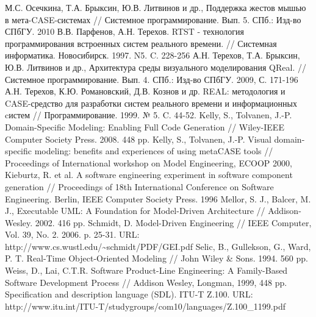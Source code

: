 \documentclass[a4paper]{article}
\begin{document}
\begin{thebibliography}{9001}
   М.С. Осечкина, Т.А. Брыксин, Ю.В. Литвинов и др., Поддержка жестов мышью в мета-CASE-системах  // Системное программирование. Вып. 5. СПб.: Изд-во СПбГУ. 2010
   В.В. Парфенов, А.Н. Терехов. RTST - технология программирования встроенных систем реального времени. // Системная информатика. Новосибирск. 1997. N5. C. 228-256
   А.Н. Терехов, Т.А. Брыксин, Ю.В. Литвинов и др., Архитектура среды визуального моделирования QReal. // Системное программирование. Вып. 4. СПб.: Изд-во СПбГУ. 2009, С. 171-196
   А.Н. Терехов, К.Ю. Романовский, Д.В. Кознов и др. REAL: методология и CASE-средство для разработки систем реального времени и информационных cистем // Программирование. 1999. № 5. C. 44-52.
   Kelly, S., Tolvanen, J.-P. Domain-Specific Modeling: Enabling Full Code Generation // Wiley-IEEE Computer Society Press. 2008. 448 pp.
   Kelly, S., Tolvanen, J.-P. Visual domain-specific modeling: benefits and experiences of using metaCASE tools // Proceedings of International workshop on Model Engineering, ECOOP 2000, 
   Kieburtz, R. et al. A software engineering experiment in software component generation // Proceedings of 18th International Conference on Software Engineering. Berlin, IEEE Computer Society Press. 1996
   Mellor, S. J., Balcer, M. J., Executable UML: A Foundation for Model-Driven Architecture // Addison-Wesley. 2002. 416 pp.
   Schmidt, D. Model-Driven Engineering // IEEE Computer, Vol. 39, No. 2. 2006. p. 25-31. URL: http://www.cs.wustl.edu/\textasciitilde schmidt/PDF/GEI.pdf
   Selic, B., Gullekson, G., Ward, P. T. Real-Time Object-Oriented Modeling // John Wiley \& Sons. 1994. 560 pp.
   Weiss, D., Lai, C.T.R. Software Product-Line Engineering: A Family-Based Software Development Process // Addison Wesley, Longman, 1999, 448 pp.	
   Specification and description language (SDL). ITU-T Z.100. URL: http://www.itu.int/ITU-T/studygroups/com10/languages/Z.100\_1199.pdf

\end{thebibliography}
\end{document}
